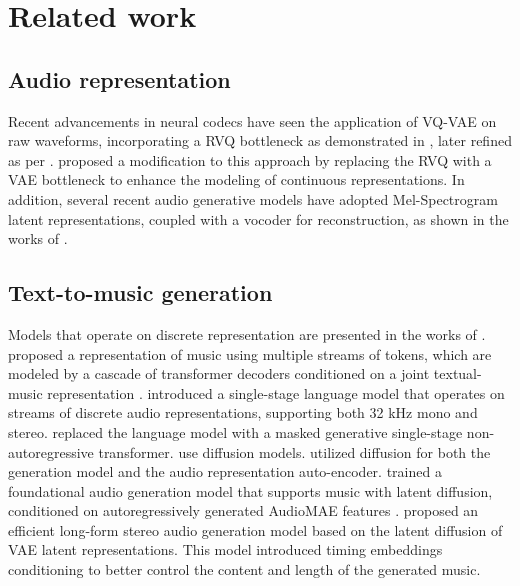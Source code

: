\section{Related work}
\subsection{Audio representation}

Recent advancements in neural codecs have seen the application of VQ-VAE on raw waveforms, incorporating a RVQ bottleneck as demonstrated in \cite{zeghidour2021soundstream,defossez2022high}, later refined as per \cite{kumar2024high}. \citet{evans2024fast} proposed a modification to this approach by replacing the RVQ with a VAE bottleneck to enhance the modeling of continuous representations.
In addition, several recent audio generative models have adopted Mel-Spectrogram latent representations, coupled with a vocoder for reconstruction, as shown in the works of \citep{ghosal2023text,liu2023audioldm2,le2024voicebox}.

\subsection{Text-to-music generation}

Models that operate on discrete representation are presented in the works of \citep{agostinelli2023musiclm,copet2024simple,ziv2023masked}. \cite{agostinelli2023musiclm} proposed a representation of music using multiple streams of tokens, which are modeled by a cascade of transformer decoders conditioned on a joint textual-music representation \citep{huang2022mulan}.
\cite{copet2024simple} introduced a single-stage language model that operates on streams of discrete audio representations, supporting both 32 kHz mono and stereo. \cite{ziv2023masked} replaced the language model with a masked generative single-stage non-autoregressive transformer.
\cite{schneider2023mo,huang2023noise2music,liu2023audioldm2} use diffusion models. \cite{schneider2023mo} utilized diffusion for both the generation model and the audio representation auto-encoder. \cite{liu2023audioldm2} trained a foundational audio generation model that supports music with latent diffusion, conditioned on autoregressively generated AudioMAE features \citep{huang2022masked}.
\cite{evans2024fast,evans2024longform} proposed an efficient long-form stereo audio generation model based on the latent diffusion of VAE latent representations. This model introduced timing embeddings conditioning to better control the content and length of the generated music.

